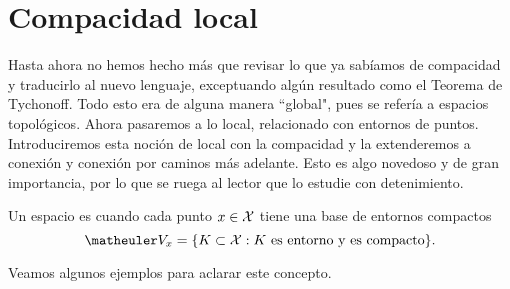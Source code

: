 \section{Compacidad local}

Hasta ahora no hemos hecho más que revisar lo que ya sabíamos de compacidad y traducirlo al nuevo lenguaje, exceptuando algún resultado como el Teorema de Tychonoff. Todo esto era de alguna manera ``global", pues se refería  a espacios topológicos. Ahora pasaremos a lo local, relacionado con entornos de puntos. Introduciremos esta noción de local con la compacidad y la extenderemos a conexión y conexión por caminos más adelante. Esto es algo novedoso y de gran importancia, por lo que se ruega al lector que lo estudie con detenimiento.

\begin{defi} Un espacio es  cuando cada punto $x\in\mathcal{X}$ tiene una base de entornos compactos
	\[\Va{x}=\{K\subset \X: K\text{ es entorno y es compacto}\}.\]
\end{defi}

Veamos algunos ejemplos para aclarar este concepto. 

